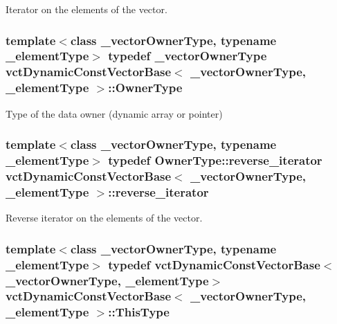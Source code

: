 Iterator on the elements of the vector. \hypertarget{classvct_dynamic_const_vector_base_a6d92548fcc7076cbd4c091ceb0faf364}{
\subsubsection[{Owner\-Type}]{\setlength{\rightskip}{0pt plus 5cm}template$<$class \-\_\-vector\-Owner\-Type, typename \-\_\-element\-Type$>$ typedef \-\_\-vector\-Owner\-Type {\bf vct\-Dynamic\-Const\-Vector\-Base}$<$ \-\_\-vector\-Owner\-Type, \-\_\-element\-Type $>$\-::{\bf Owner\-Type}}}\label{classvct_dynamic_const_vector_base_a6d92548fcc7076cbd4c091ceb0faf364}
Type of the data owner (dynamic array or pointer) \hypertarget{classvct_dynamic_const_vector_base_af10d167259519ceeca9276da3435e193}{
\subsubsection[{reverse\-\_\-iterator}]{\setlength{\rightskip}{0pt plus 5cm}template$<$class \-\_\-vector\-Owner\-Type, typename \-\_\-element\-Type$>$ typedef Owner\-Type\-::reverse\-\_\-iterator {\bf vct\-Dynamic\-Const\-Vector\-Base}$<$ \-\_\-vector\-Owner\-Type, \-\_\-element\-Type $>$\-::{\bf reverse\-\_\-iterator}}}\label{classvct_dynamic_const_vector_base_af10d167259519ceeca9276da3435e193}
Reverse iterator on the elements of the vector. \hypertarget{classvct_dynamic_const_vector_base_a39da273523717f678f54d3321ebca3dd}{
\subsubsection[{This\-Type}]{\setlength{\rightskip}{0pt plus 5cm}template$<$class \-\_\-vector\-Owner\-Type, typename \-\_\-element\-Type$>$ typedef {\bf vct\-Dynamic\-Const\-Vector\-Base}$<$\-\_\-vector\-Owner\-Type, \-\_\-element\-Type$>$ {\bf vct\-Dynamic\-Const\-Vector\-Base}$<$ \-\_\-vector\-Owner\-Type, \-\_\-element\-Type $>$\-::{\bf This\-Type}}}\label{classvct_dynamic_const_vector_base_a39da273523717f678f54d3321ebca3dd}
